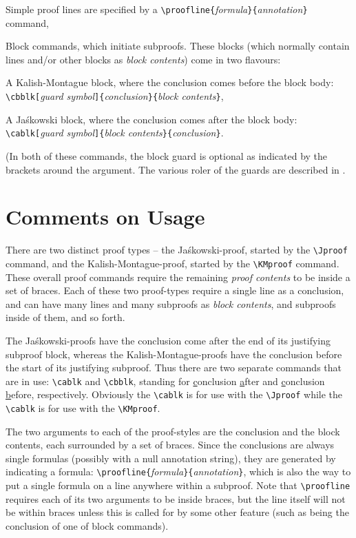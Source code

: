 \documentclass{article}
\newcommand{\Jas}{Ja\'skowski }
\newcommand{\JasA}{Ja\'skowski}
\newcommand{\KMa}{Kalish-Montague}
\begin{document}
\begin{compactenum}
\item Simple proof lines are specified by a \verb+\proofline{+\emph{formula}\verb+}{+\emph{annotation}\verb+}+ command, 
\item Block commands, which initiate subproofs.  These blocks (which normally contain lines and/or other blocks as \emph{block contents}) come in two flavours: 
\begin{compactenum}[(i)]
\item A Kalish-Montague block, where  the conclusion comes before the block body: \\ \verb+\cbblk[+\emph{guard symbol}\verb+]{+\emph{conclusion}\verb+}{+\emph{block contents}\verb+}+, 
\item A \Jas block, where the conclusion comes after the block body: \\ \verb+\cablk[+\emph{guard symbol}\verb+]{+\emph{block contents}\verb+}{+\emph{conclusion}\verb+}+. 
\item (In both of these commands, the block guard is optional as indicated by the brackets around the argument.  The various roler of the guards are described in \cite{ext14}.
\end{compactenum}
\end{compactenum}

\section{Comments on Usage}
There are two distinct proof types -- the \JasA-proof, started by the \verb+\Jproof+ command, and the \KMa-proof, started by the \verb+\KMproof+ command.  These overall proof commands require the remaining \emph{proof contents} to be inside a set of braces.  Each of these two proof-types require a single line as a conclusion, and can have many lines and many subproofs as \emph{block contents}, and subproofs inside of them, and so forth.

The \JasA-proofs have the conclusion come after the end of its justifying subproof block, whereas the \KMa-proofs have the conclusion before the start of its justifying subproof.  Thus there are two separate commands that are in use: \verb+\cablk+ and \verb+\cbblk+, standing for \uline{c}onclusion \uline{a}fter and \uline{c}onclusion \uline{b}efore, respectively.  Obviously the \verb+\cablk+ is for use with the \verb+\Jproof+ while the \verb+\cablk+ is for use with the \verb+\KMproof+.

The two arguments to each of the proof-styles are the conclusion and the block contents, each surrounded by a set of braces.  Since the conclusions are always single formulas (possibly with a null annotation string), they are generated by indicating a formula: \verb+\proofline{+\emph{formula}\verb+}{+\emph{annotation}\verb+}+, which is also the way to put a single formula on a line anywhere within a subproof.  Note that \verb+\proofline+ requires each of its two arguments to be inside braces, but the line itself will not be within braces unless this is called for by some other feature (such as being the conclusion of one of block commands).
\end{document}
